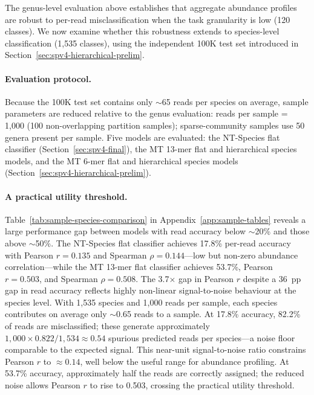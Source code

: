 The genus-level evaluation above establishes that aggregate abundance profiles are robust to per-read misclassification when the task granularity is low (120 classes).
We now examine whether this robustness extends to species-level classification (1,535 classes), using the independent 100K test set introduced in Section~\ref{sec:spv4-hierarchical-prelim}.

\paragraph{Evaluation protocol.}
Because the 100K test set contains only $\sim$65 reads per species on average, sample parameters are reduced relative to the genus evaluation: reads per sample = 1,000 (100 non-overlapping partition samples); sparse-community samples use 50 genera present per sample.
Five models are evaluated: the NT-Species flat classifier (Section~\ref{sec:spv4-final}), the MT 13-mer flat and hierarchical species models, and the MT 6-mer flat and hierarchical species models (Section~\ref{sec:spv4-hierarchical-prelim}).

\paragraph{A practical utility threshold.}
Table~\ref{tab:sample-species-comparison} in Appendix~\ref{app:sample-tables} reveals a large performance gap between models with read accuracy below $\sim$20\% and those above $\sim$50\%.
The NT-Species flat classifier achieves 17.8\% per-read accuracy with Pearson $r = 0.135$ and Spearman $\rho = 0.144$---low but non-zero abundance correlation---while the MT 13-mer flat classifier achieves 53.7\%, Pearson $r = 0.503$, and Spearman $\rho = 0.508$.
The 3.7$\times$ gap in Pearson $r$ despite a 36~pp gap in read accuracy reflects highly non-linear signal-to-noise behaviour at the species level.
With 1,535 species and 1,000 reads per sample, each species contributes on average only $\sim$0.65 reads to a sample.
At 17.8\% accuracy, 82.2\% of reads are misclassified; these generate approximately $1{,}000 \times 0.822 / 1{,}534 \approx 0.54$ spurious predicted reads per species---a noise floor comparable to the expected signal.
This near-unit signal-to-noise ratio constrains Pearson $r$ to $\approx 0.14$, well below the useful range for abundance profiling.
At 53.7\% accuracy, approximately half the reads are correctly assigned; the reduced noise allows Pearson $r$ to rise to 0.503, crossing the practical utility threshold.

